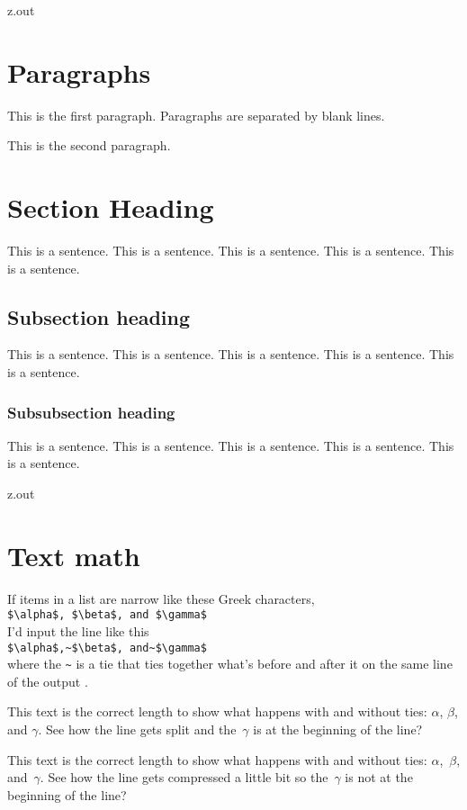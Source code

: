 \begin{VerbatimOut}{z.out}


\section{Paragraphs}

This is the first paragraph.
Paragraphs are separated by blank lines.

This is the second paragraph.


\section{Section Heading}

This is a sentence.
This is a sentence.
This is a sentence.
This is a sentence.
This is a sentence.


\subsection{Subsection heading}

This is a sentence.
This is a sentence.
This is a sentence.
This is a sentence.
This is a sentence.


\subsubsection{Subsubsection heading}

This is a sentence.
This is a sentence.
This is a sentence.
This is a sentence.
This is a sentence.
\end{VerbatimOut}

\MyIO



\begin{VerbatimOut}{z.out}


\section{Text math}

If items in a list are narrow like these Greek characters,\\
     \verb+$\alpha$, $\beta$, and $\gamma$+\\
I'd input the line like this\\
     \verb+$\alpha$,~$\beta$, and~$\gamma$+\\
where the \verb+~+ is a tie
that ties together what's before and after it on the same line of the output
\cite[page~92]{knuth2012}.

This text is the correct length to show what happens with and without ties:
$\alpha$,
$\beta$,
and $\gamma$.
See how the line gets split
and the~$\gamma$ is at the beginning of the line?

This text is the correct length to show what happens with and without ties:
$\alpha$,~$\beta$,
and~$\gamma$.
See how the line gets compressed a little bit so the~$\gamma$
is not at the beginning of the line?
\end{VerbatimOut}

\MyIO
